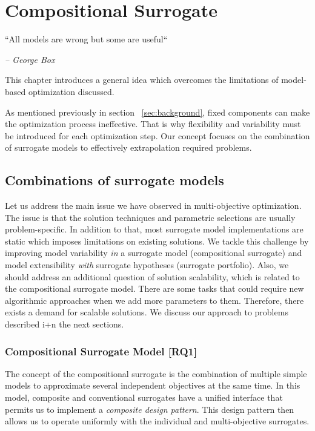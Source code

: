 \chapter{Compositional Surrogate}\label{sec:concept}

    \epigraph{``All models are wrong but some are useful``}{\textit{– George Box}}

    This chapter introduces a general idea which overcomes the limitations of model-based optimization discussed.

    As mentioned previously in section ~\ref{sec:background}, fixed components can make the optimization process ineffective. That is why flexibility and variability must be introduced for each optimization step. Our concept focuses on the combination of surrogate models to effectively extrapolation required problems.



    \section{Combinations of surrogate models}

        Let us address the main issue we have observed in multi-objective optimization. The issue is that the solution techniques and parametric selections are usually problem-specific. In addition to that, most surrogate model implementations are static which imposes limitations on existing solutions. We tackle this challenge by improving model variability \emph{in} a surrogate model (compositional surrogate) and model extensibility \emph{with} surrogate hypotheses (surrogate portfolio). Also, we should address an additional question of solution scalability, which is related to the compositional surrogate model. There are some tasks that could require new algorithmic approaches when we add more parameters to them. Therefore, there exists a demand for scalable solutions. We discuss our approach to problems described i+n the next sections.

        \subsection{Compositional Surrogate Model [RQ1]}
            The concept of the compositional surrogate is the combination of multiple simple models to approximate several independent objectives at the same time. In this model, composite and conventional surrogates have a unified interface that permits us to implement a \emph{composite design pattern}\cite{bookGOF}. This design pattern then allows us to operate uniformly with the individual and multi-objective surrogates. 

